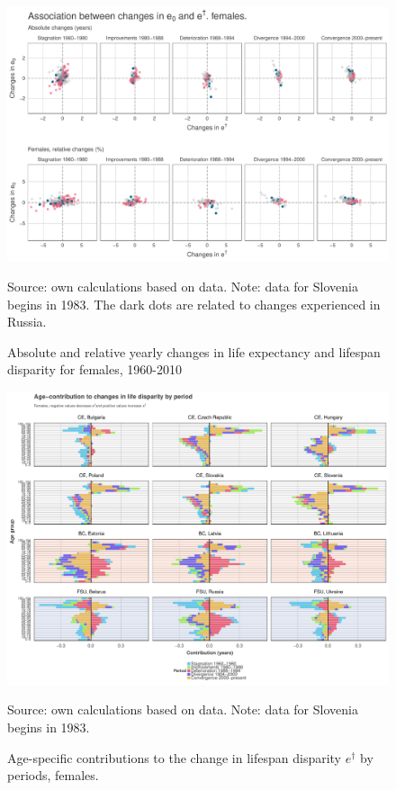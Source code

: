 \documentclass{article}
\begin{document}
\begin{figure}[h!]
\centering
\caption{Absolute and relative yearly changes in life expectancy and lifespan disparity for females, 1960-2010}
\begin{center}
\includegraphics[scale=.47]{Figures/changes_females.pdf}
\end{center}
Source: own calculations based on \citet{HMD} data. Note: data for Slovenia begins in 1983. The dark dots are related to changes experienced in Russia.
\end{figure}

\newpage

\begin{figure}[h!]
\caption{Age-specific contributions to the change in lifespan disparity $e^\dagger$ by periods, females.}
\centering
\begin{center}
\includegraphics[scale=.5]{Figures/Age_ed_decomp_Females.pdf}
\end{center}
Source: own calculations based on \citet{HMD} data. Note: data for Slovenia begins in 1983.
\end{figure}
\end{document}
